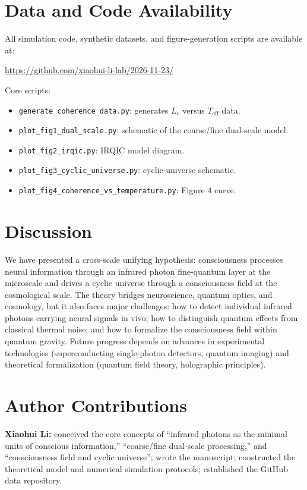 \documentclass[11pt,a4paper]{article}
\begin{document}
\section{Data and Code Availability}

All simulation code, synthetic datasets, and figure-generation scripts are available at:
\begin{center}
\url{https://github.com/xiaohui-li-lab/2026-11-23/}
\end{center}

Core scripts:
\begin{itemize}
    \item \texttt{generate\_coherence\_data.py}: generates $L_c$ versus $T_{\text{eff}}$ data.
    \item \texttt{plot\_fig1\_dual\_scale.py}: schematic of the coarse/fine dual-scale model.
    \item \texttt{plot\_fig2\_irqic.py}: IRQIC model diagram.
    \item \texttt{plot\_fig3\_cyclic\_universe.py}: cyclic-universe schematic.
    \item \texttt{plot\_fig4\_coherence\_vs\_temperature.py}: Figure 4 curve.
\end{itemize}

\section{Discussion}

We have presented a cross-scale unifying hypothesis: consciousness processes neural information through an infrared photon fine-quantum layer at the microscale and drives a cyclic universe through a consciousness field at the cosmological scale. The theory bridges neuroscience, quantum optics, and cosmology, but it also faces major challenges: how to detect individual infrared photons carrying neural signals in vivo; how to distinguish quantum effects from classical thermal noise; and how to formalize the consciousness field within quantum gravity. Future progress depends on advances in experimental technologies (superconducting single-photon detectors, quantum imaging) and theoretical formalization (quantum field theory, holographic principles).

\section{Author Contributions}

\textbf{Xiaohui Li:} conceived the core concepts of ``infrared photons as the minimal units of conscious information,'' ``coarse/fine dual-scale processing,'' and ``consciousness field and cyclic universe''; wrote the manuscript; constructed the theoretical model and numerical simulation protocols; established the GitHub data repository.
\end{document}
